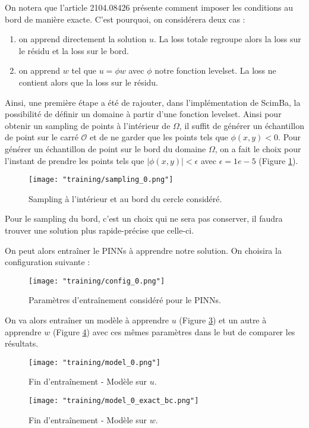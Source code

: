 On notera que l'article 2104.08426 présente comment imposer les conditions au bord de manière exacte. C'est pourquoi, on considérera deux cas :
\begin{enumerate}[label=\textbullet]
	\item on apprend directement la solution $u$. La loss totale regroupe alors la loss sur le résidu et la loss sur le bord.
	\item on apprend $w$ tel que $u=\phi w$ avec $\phi$ notre fonction levelset. La loss ne contient alors que la loss sur le résidu. 
\end{enumerate}
Ainsi, une première étape a été de rajouter, dans l'implémentation de ScimBa, la possibilité de définir un domaine à partir d'une fonction levelset. Ainsi pour obtenir un sampling de points à l'intérieur de $\Omega$, il suffit de générer un échantillon de point sur le carré $\mathcal{O}$ et de ne garder que les points tels que $\phi(x,y)<0$. Pour générer un échantillon de point sur le bord du domaine $\Omega$, on a fait le choix pour l'instant de prendre les points tels que $|\phi(x,y)|<\epsilon$ avec $\epsilon=1e-5$ (Figure \ref{sampling_0}).

\begin{figure}[H]
	\centering
	\texttt{[image: "training/sampling\_0.png"]}
	\caption{Sampling à l'intérieur et au bord du cercle considéré.}
	\label{sampling_0}
\end{figure}

\begin{Rem}
	Pour le sampling du bord, c'est un choix qui ne sera pas conserver, il faudra trouver une solution plus rapide-précise que celle-ci.
\end{Rem}

On peut alors entraîner le PINNs à apprendre notre solution. On choisira la configuration suivante :
\begin{figure}[H]
	\centering
	\texttt{[image: "training/config\_0.png"]}
	\caption{Paramètres d'entraînement considéré pour le PINNs.}
	\label{config_0}
\end{figure}

On va alors entraîner un modèle à apprendre $u$ (Figure \ref{model_0}) et un autre à apprendre $w$ (Figure \ref{model_0_exact_bc}) avec ces mêmes paramètres dans le but de comparer les résultats.

\begin{minipage}{0.48\linewidth}
	\begin{figure}[H]
		\centering
		\texttt{[image: "training/model\_0.png"]}
		\caption{Fin d'entraînement - Modèle sur $u$.}
		\label{model_0}
	\end{figure}
\end{minipage}
\begin{minipage}{0.48\linewidth}
	\begin{figure}[H]
		\centering
		\texttt{[image: "training/model\_0\_exact\_bc.png"]}
		\caption{Fin d'entraînement - Modèle sur $w$.}
		\label{model_0_exact_bc}
	\end{figure}
\end{minipage}

